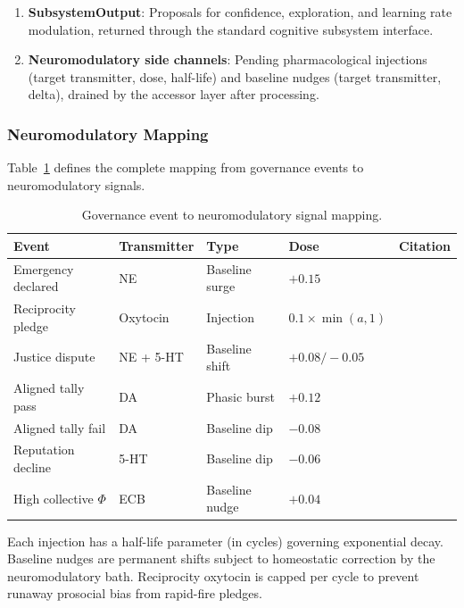 \documentclass[11pt,a4paper]{article}
\begin{document}
\begin{enumerate}
  \item \textbf{SubsystemOutput}: Proposals for confidence, exploration, and learning rate modulation, returned through the standard cognitive subsystem interface.
  \item \textbf{Neuromodulatory side channels}: Pending pharmacological injections (target transmitter, dose, half-life) and baseline nudges (target transmitter, delta), drained by the accessor layer after processing.
\end{enumerate}

\subsubsection{Neuromodulatory Mapping}

Table~\ref{tab:neuromod} defines the complete mapping from governance events to neuromodulatory signals.

\begin{table}[h]
\centering
\caption{Governance event to neuromodulatory signal mapping.}
\label{tab:neuromod}
\begin{tabular}{p{3.2cm}p{2.8cm}p{2.2cm}p{1.5cm}p{2.5cm}}
\toprule
\textbf{Event} & \textbf{Transmitter} & \textbf{Type} & \textbf{Dose} & \textbf{Citation} \\
\midrule
Emergency declared & NE & Baseline surge & $+0.15$ & \citet{arnsten2009stress} \\
Reciprocity pledge & Oxytocin & Injection & $0.1 \times \min(a, 1)$ & \citet{zak2012moral} \\
Justice dispute & NE + 5-HT & Baseline shift & $+0.08 / -0.05$ & \citet{sapolsky2004why} \\
Aligned tally pass & DA & Phasic burst & $+0.12$ & \citet{schultz1997neural} \\
Aligned tally fail & DA & Baseline dip & $-0.08$ & \citet{schultz1997neural} \\
Reputation decline & 5-HT & Baseline dip & $-0.06$ & \citet{crockett2009serotonin} \\
High collective $\Phi$ & ECB & Baseline nudge & $+0.04$ & \citet{trezza2010endocannabinoid} \\
\bottomrule
\end{tabular}
\end{table}

Each injection has a half-life parameter (in cycles) governing exponential decay.
Baseline nudges are permanent shifts subject to homeostatic correction by the neuromodulatory bath.
Reciprocity oxytocin is capped per cycle to prevent runaway prosocial bias from rapid-fire pledges.
\end{document}
